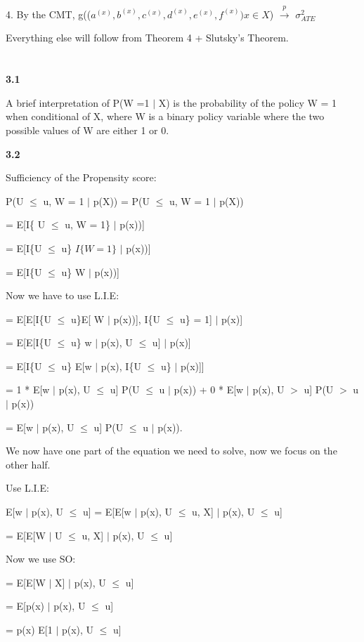 \documentclass{article}
\begin{document}
4. By the CMT, g(($a^{(x)},b^{(x)},c^{(x)},d^{(x)},e^{(x)},f^{(x)}) x \in X$) $\xrightarrow{p}$ $\sigma^{2}_{ATE}$

Everything else will follow from Theorem 4 + Slutsky's Theorem.

\section{}

\textbf{3.1}

A brief interpretation of P(W =1 $\mid$ X) is the probability of the policy W = 1 when conditional of X, where W is a binary policy variable where the two possible values of W are either 1 or 0.

\textbf{3.2}

Sufficiency of the Propensity score:

P(U $\leq$ u, W = 1 $\mid$ p(X)) = P(U $\leq$ u, W = 1 $\mid$ p(X))

= E[I\{ U $\leq$ u, W = 1\} $\mid$ p(x))]

= E[I\{U $\leq$ u\} $I\{ W=1\}$ $\mid$ p(x))]

= E[I\{U $\leq$ u\} W $\mid$ p(x))]

Now we have to use L.I.E:

= E[E[I\{U $\leq$ u\}E[ W $\mid$ p(x))], I\{U $\leq$ u\} = 1] $\mid$ p(x)]

= E[E[I\{U $\leq$ u\} w $\mid$ p(x), U $\leq$ u] $\mid$ p(x)]

= E[I\{U $\leq$ u\} E[w $\mid$ p(x), I\{U $\leq$ u\} $\mid$ p(x)]]

= 1 * E[w $\mid$ p(x), U $\leq$ u] P(U $\leq$ u $\mid$ p(x)) + 0 * E[w $\mid$ p(x), U $>$ u] P(U $>$ u $\mid$ p(x))

= E[w $\mid$ p(x), U $\leq$ u] P(U $\leq$ u $\mid$ p(x)).

We now have one part of the equation we need to solve, now we focus on the other half.

Use L.I.E:

E[w $\mid$ p(x), U $\leq$ u] = E[E[w $\mid$ p(x), U $\leq$ u, X] $\mid$ p(x), U $\leq$ u]

= E[E[W $\mid$ U $\leq$ u, X] $\mid$ p(x), U $\leq$ u]

Now we use SO:

= E[E[W $\mid$ X] $\mid$ p(x), U $\leq$ u]

= E[p(x) $\mid$ p(x), U $\leq$ u]

= p(x) E[1 $\mid$ p(x), U $\leq$ u]
\end{document}

